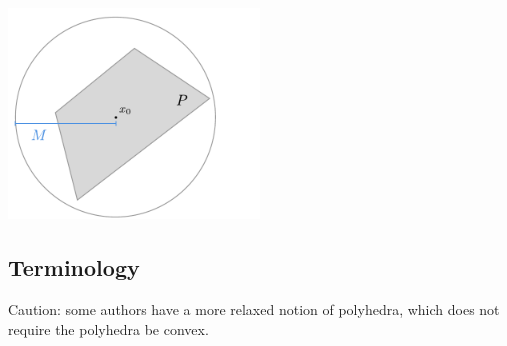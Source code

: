 \begin{center}\includegraphics[width=0.50\textwidth]{./graphics/polytope_bounded.pdf}\end{center}
\subsection*{Terminology}

Caution: some authors have a more relaxed notion of polyhedra, which does not require the polyhedra be convex.


\blankpage